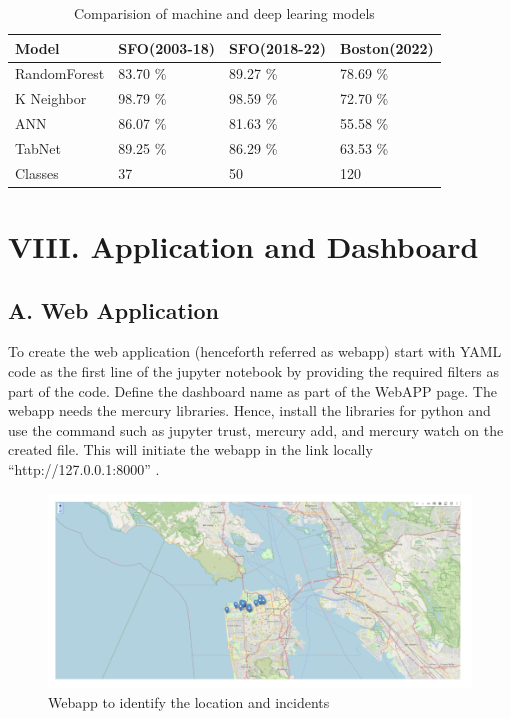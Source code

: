 \documentclass[10 pt,conference,final,]{IEEEtran}
\begin{document}
\begin{table}
\centering
\caption{\label{tab:unnamed-chunk-17}Comparision of machine and deep learing models}
\centering
\begin{tabular}[t]{l|l|l|l}
\hline
Model & SFO(2003-18) & SFO(2018-22) & Boston(2022)\\
\hline
RandomForest & 83.70 \% & 89.27 \% & 78.69 \%\\
\hline
K Neighbor & 98.79 \% & 98.59 \% & 72.70 \%\\
\hline
ANN & 86.07 \% & 81.63 \% & 55.58 \%\\
\hline
TabNet & 89.25 \% & 86.29 \% & 63.53 \%\\
\hline
Classes & 37 & 50 & 120\\
\hline
\end{tabular}
\end{table}

\section{VIII. Application and
Dashboard}\label{viii.-application-and-dashboard}

\subsection{A. Web Application}\label{a.-web-application}

To create the web application (henceforth referred as webapp) start with
YAML code as the first line of the jupyter notebook by providing the
required filters as part of the code. Define the dashboard name as part
of the WebAPP page. The webapp needs the mercury libraries. Hence,
install the libraries for python and use the command such as jupyter
trust, mercury add, and mercury watch on the created file. This will
initiate the webapp in the link locally ``http://127.0.0.1:8000'' .

\begin{figure}

{\centering \includegraphics[width=0.95\linewidth]{img/fig14a} 

}

\caption{Webapp to identify the location and incidents}\label{fig:unnamed-chunk-18}
\end{figure}
\end{document}
